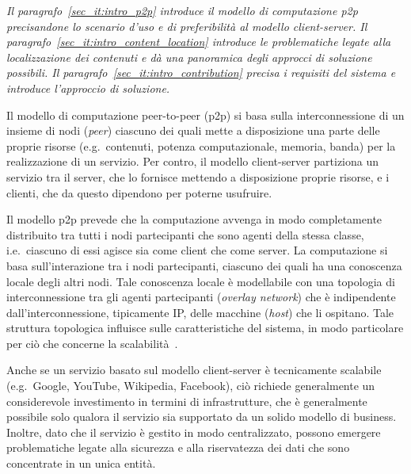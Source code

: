 \textit{Il paragrafo~\ref{sec_it:intro_p2p} introduce il modello di computazione p2p precisandone lo scenario d'uso e di preferibilità al modello client-server. Il paragrafo~\ref{sec_it:intro_content_location} introduce le problematiche legate alla localizzazione dei contenuti e dà una panoramica degli approcci di soluzione possibili. Il paragrafo~\ref{sec_it:intro_contribution} precisa i requisiti del sistema e introduce l'approccio di soluzione.%
}

Il modello di computazione peer-to-peer (p2p) si basa sulla interconnessione di un insieme di nodi (\textit{peer}) ciascuno dei quali mette a disposizione una parte delle proprie risorse (e.g.\ contenuti, potenza computazionale, memoria, banda) per la realizzazione di un servizio. Per contro, il modello client-server partiziona un servizio tra il server, che lo fornisce mettendo a disposizione proprie risorse, e i clienti, che da questo dipendono per poterne usufruire.

Il modello p2p prevede che la computazione avvenga in modo completamente distribuito tra tutti i nodi partecipanti che sono agenti della stessa classe, i.e.\ ciascuno di essi agisce sia come client che come server. La computazione si basa sull'interazione tra i nodi partecipanti, ciascuno dei quali ha una conoscenza locale degli altri nodi. Tale conoscenza locale è modellabile con una topologia di interconnessione tra gli agenti partecipanti (\textit{overlay network}) che è indipendente dall'interconnessione, tipicamente IP, delle macchine (\textit{host}) che li ospitano. Tale struttura topologica influisce sulle caratteristiche del sistema, in modo particolare per ciò che concerne la scalabilità~\cite{ATS04}.

Anche se un servizio basato sul modello client-server è tecnicamente scalabile (e.g.\ Google, YouTube, Wikipedia, Facebook), ciò richiede generalmente un considerevole investimento in termini di infrastrutture, che è generalmente possibile solo qualora il servizio sia supportato da un solido modello di business. Inoltre, dato che il servizio è gestito in modo centralizzato, possono emergere problematiche legate alla sicurezza e alla riservatezza dei dati che sono concentrate in un unica entità.

